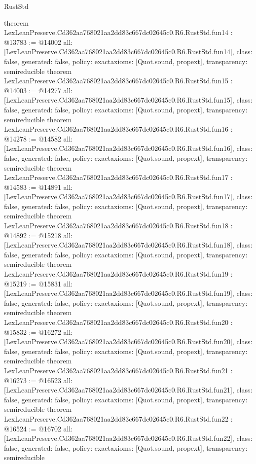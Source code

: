 \begin{lexlean}{RustStd}
\begin{coremodule}
{}
theorem LexLeanPreserve.Cd362aa768021aa2dd83c667dc02645c0.R6.RustStd.fun14 : @13783 := @14002 {
  all: [LexLeanPreserve.Cd362aa768021aa2dd83c667dc02645c0.R6.RustStd.fun14],
  class: false,
  generated: false,
  policy: exact{axioms: [Quot.sound, propext]},
  transparency: semireducible
}
theorem LexLeanPreserve.Cd362aa768021aa2dd83c667dc02645c0.R6.RustStd.fun15 : @14003 := @14277 {
  all: [LexLeanPreserve.Cd362aa768021aa2dd83c667dc02645c0.R6.RustStd.fun15],
  class: false,
  generated: false,
  policy: exact{axioms: [Quot.sound, propext]},
  transparency: semireducible
}
theorem LexLeanPreserve.Cd362aa768021aa2dd83c667dc02645c0.R6.RustStd.fun16 : @14278 := @14582 {
  all: [LexLeanPreserve.Cd362aa768021aa2dd83c667dc02645c0.R6.RustStd.fun16],
  class: false,
  generated: false,
  policy: exact{axioms: [Quot.sound, propext]},
  transparency: semireducible
}
theorem LexLeanPreserve.Cd362aa768021aa2dd83c667dc02645c0.R6.RustStd.fun17 : @14583 := @14891 {
  all: [LexLeanPreserve.Cd362aa768021aa2dd83c667dc02645c0.R6.RustStd.fun17],
  class: false,
  generated: false,
  policy: exact{axioms: [Quot.sound, propext]},
  transparency: semireducible
}
theorem LexLeanPreserve.Cd362aa768021aa2dd83c667dc02645c0.R6.RustStd.fun18 : @14892 := @15218 {
  all: [LexLeanPreserve.Cd362aa768021aa2dd83c667dc02645c0.R6.RustStd.fun18],
  class: false,
  generated: false,
  policy: exact{axioms: [Quot.sound, propext]},
  transparency: semireducible
}
theorem LexLeanPreserve.Cd362aa768021aa2dd83c667dc02645c0.R6.RustStd.fun19 : @15219 := @15831 {
  all: [LexLeanPreserve.Cd362aa768021aa2dd83c667dc02645c0.R6.RustStd.fun19],
  class: false,
  generated: false,
  policy: exact{axioms: [Quot.sound, propext]},
  transparency: semireducible
}
theorem LexLeanPreserve.Cd362aa768021aa2dd83c667dc02645c0.R6.RustStd.fun20 : @15832 := @16272 {
  all: [LexLeanPreserve.Cd362aa768021aa2dd83c667dc02645c0.R6.RustStd.fun20],
  class: false,
  generated: false,
  policy: exact{axioms: [Quot.sound, propext]},
  transparency: semireducible
}
theorem LexLeanPreserve.Cd362aa768021aa2dd83c667dc02645c0.R6.RustStd.fun21 : @16273 := @16523 {
  all: [LexLeanPreserve.Cd362aa768021aa2dd83c667dc02645c0.R6.RustStd.fun21],
  class: false,
  generated: false,
  policy: exact{axioms: [Quot.sound, propext]},
  transparency: semireducible
}
theorem LexLeanPreserve.Cd362aa768021aa2dd83c667dc02645c0.R6.RustStd.fun22 : @16524 := @16702 {
  all: [LexLeanPreserve.Cd362aa768021aa2dd83c667dc02645c0.R6.RustStd.fun22],
  class: false,
  generated: false,
  policy: exact{axioms: [Quot.sound, propext]},
  transparency: semireducible
}
\end{coremodule}
\end{lexlean}
